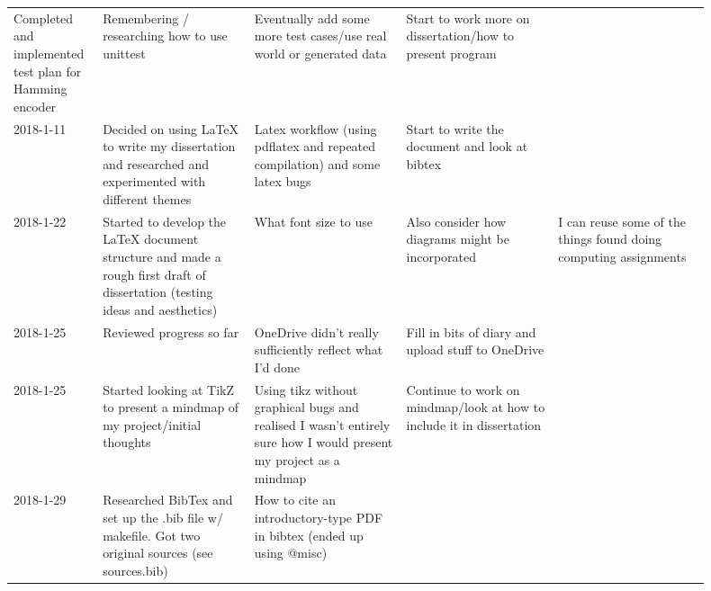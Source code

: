 \documentclass{article}
\begin{document}
\begin{center}
{\begin{longtable}{p{0.1\linewidth} p{0.2\linewidth} p{0.2\linewidth} p{0.2\linewidth} p{0.2\linewidth}}
    Completed and implemented test plan for Hamming encoder &

    Remembering / researching how to use unittest &

    Eventually add some more test cases/use real world or generated data &

    Start to work more on dissertation/how to present program \\ 2018-1-11 &

    Decided on using LaTeX to write my dissertation and researched and
    experimented with different themes &

    Latex workflow (using pdflatex and repeated compilation) and some latex
    bugs &

    Start to write the document and look at bibtex &

    \\ 2018-1-22 &

    Started to develop the LaTeX document structure and made a rough first
    draft of dissertation (testing ideas and aesthetics) &

    What font size to use &

    Also consider how diagrams might be incorporated &

    I can reuse some of the things found doing computing assignments \\
    2018-1-25 &

    Reviewed progress so far &

    OneDrive didn't really sufficiently reflect what I'd done &

    Fill in bits of diary and upload stuff to OneDrive &

    \\ 2018-1-25 &

    Started looking at TikZ to present a mindmap of my project/initial thoughts
    &

    Using tikz without graphical bugs and realised I wasn't entirely sure how I
    would present my project as a mindmap &

    Continue to work on mindmap/look at how to include it in dissertation &

    \\ 2018-1-29 &

    Researched BibTex and set up the .bib file w/ makefile. Got two original
    sources (see sources.bib) &

    How to cite an introductory-type PDF in bibtex (ended up using @misc) &


\end{longtable}}
\end{center}
\end{document}
